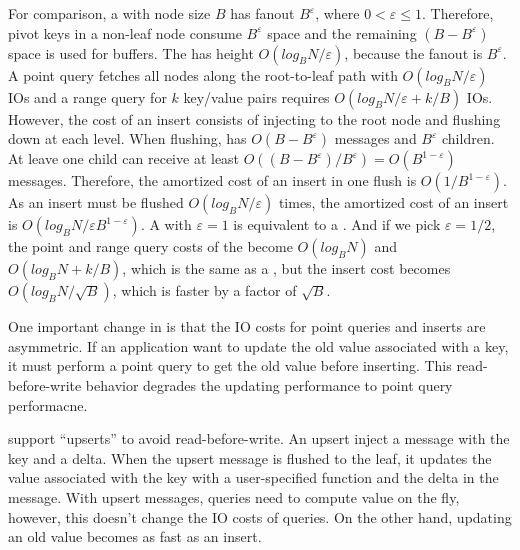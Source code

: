 For comparison, a \bet with node size $B$ has fanout $B^{\varepsilon}$, where
$0 < \varepsilon \leq 1$.
Therefore, pivot keys in a non-leaf node consume $B^{\varepsilon}$ space and
the remaining $(B - B^{\varepsilon})$ space is used for buffers.
The \bet has height $O(log_{B}{N}/\varepsilon)$, because the fanout is
$B^{\varepsilon}$.
A point query fetches all nodes along the root-to-leaf path with
$O(log_{B}{N}/\varepsilon)$ IOs and a range query for $k$ key/value pairs
requires $O({log_{B}{N}}/{\varepsilon} + k/B)$ IOs.
However, the cost of an insert consists of injecting to the root node and
flushing down at each level.
When flushing, \bets has $O(B - B^{\varepsilon})$ messages and $B^{\varepsilon}$
children.
At leave one child can receive at least
$O((B - B^{\varepsilon})/B^{\varepsilon}) = O(B^{1 - \varepsilon})$ messages.
Therefore, the amortized cost of an insert in one flush is
$O(1/B^{1 - \varepsilon})$.
As an insert must be flushed $O(log_{B}{N}/\varepsilon)$ times, the amortized
cost of an insert is $O({log_{B}{N}}/{\varepsilon B^{1 - \varepsilon}})$.
A \bet with $\varepsilon = 1$ is equivalent to a \btree.
And if we pick $\varepsilon = 1/2$, the point and range query costs of the \bet
become $O(log_{B}{N})$ and $O(log_{B}{N} + k/B)$, which is the same as a \btree,
but the insert cost becomes $O(log_{B}{N}/{\sqrt{B}})$, which is faster by a
factor of $\sqrt{B}$.

One important change in \bets is that the IO costs for point queries and inserts
are asymmetric.
If an application want to update the old value associated with a key,
it must perform a point query to get the old value before inserting.
This read-before-write behavior degrades the updating performance to point query
performacne.

\bets support ``upserts'' to avoid read-before-write.
An upsert inject a message with the key and a delta.
When the upsert message is flushed to the leaf, it updates the value associated
with the key with a user-specified function and the delta in the message.
With upsert messages, queries need to compute value on the fly, however, this
doesn't change the IO costs of queries.
On the other hand, updating an old value becomes as fast as an insert.

\section{\betrfs}
\label{sec:betrfs}

